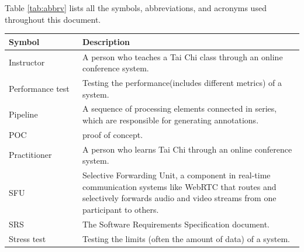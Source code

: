 \documentclass[12pt, titlepage]{article}
\begin{document}
Table \ref{tab:abbrv} lists all the symbols, abbreviations, and acronyms used
throughout this document.
\renewcommand{\arraystretch}{1.2}
\begin{table}[H]
  \centering
  \begin{tabular}{L{0.25\linewidth}L{0.8\linewidth}} \toprule
    \textbf{Symbol}                  & \textbf{Description}                                                                                                                                                                    \\ \midrule
    Instructor                 & A person who teaches a Tai Chi class through an online conference system.                                                                                                          \\
    Performance test           & Testing the performance(includes different metrics) of a system.                                                                                                                   \\
    Pipeline                   & A sequence of processing elements connected in series, which are responsible for generating annotations.                                                                           \\
    POC                        & proof of concept.                                                                                                                                                                  \\
    Practitioner               & A person who learns Tai Chi through an online conference system.                                                                                                                   \\
    SFU                        & Selective Forwarding Unit, a component in real-time communication systems like WebRTC that routes and selectively forwards audio and video streams from one participant to others. \\
    SRS                        & The Software Requirements Specification document.                                                                                                                                  \\
    Stress test                & Testing the limits (often the amount of data) of a system.                                                                                                                         \\

\end{tabular}
\end{table}
\end{document}
